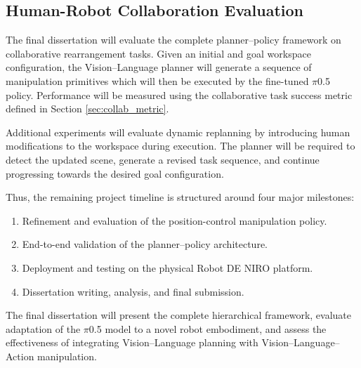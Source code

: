 \documentclass[conference, 12pt]{IEEEtran}
\begin{document}


\subsection{Human-Robot Collaboration Evaluation}

The final dissertation will evaluate the complete planner--policy framework on collaborative rearrangement tasks. Given an initial and goal workspace configuration, the Vision--Language planner will generate a sequence of manipulation primitives which will then be executed by the fine-tuned $\pi$0.5 policy. Performance will be measured using the collaborative task success metric defined in Section \ref{sec:collab_metric}.

Additional experiments will evaluate dynamic replanning by introducing human modifications to the workspace during execution. The planner will be required to detect the updated scene, generate a revised task sequence, and continue progressing towards the desired goal configuration.

Thus, the remaining project timeline is structured around four major milestones:

\begin{enumerate}
\item Refinement and evaluation of the position-control manipulation policy.
\item End-to-end validation of the planner--policy architecture.
\item Deployment and testing on the physical Robot DE NIRO platform.
\item Dissertation writing, analysis, and final submission.

\end{enumerate}
The final dissertation will present the complete hierarchical framework, evaluate adaptation of the $\pi$0.5 model to a novel robot embodiment, and assess the effectiveness of integrating Vision--Language planning with Vision--Language--Action manipulation.
\end{document}
